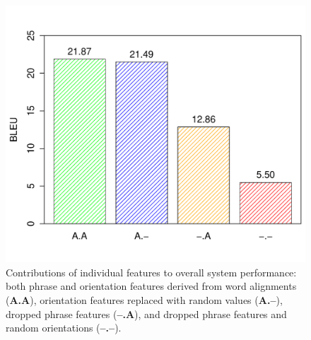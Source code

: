 \documentclass[11pt]{article}
\begin{document}
\begin{figure}[t]
\begin{center}
\includegraphics[width=\linewidth]{../figures/lesion/lesions.pdf}
\caption{Contributions of individual features to overall system performance: both phrase and orientation features derived from word alignments ({\bf A.A}), orientation features replaced with random values ({\bf A.--}), dropped phrase features ({\bf --.A}), and dropped phrase features and random orientations ({\bf --.--}).}
\label{fig:lesion}
\end{center}
\vskip -0.2in
\end{figure}
\end{document}

